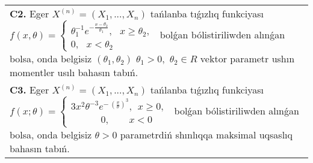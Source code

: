 \documentclass{article}
\begin{document}
\begin{tabular}{m{17cm}}
 \\
\textbf{C2.} 
Eger \(X^{(n)} = \left( X_{1},...,X_{n} \right)\) tańlanba tıǵızlıq funkciyası
$f(x,\theta) = \left\{ \begin{array}{r}
\theta_{1}^{- 1}e^{- \frac{x - \theta_{2}}{\theta_{1}}},\ \ \ x \geq \theta_{2}, \\
0,\ \ \ x < \theta_{2}
\end{array} \right.\ $
bolǵan bólistiriliwden alınǵan bolsa, onda belgisiz \(\left( \theta_{1},\theta_{2} \right)\) \(\theta_{1} > 0,\) \(\theta_{2} \in R\) vektor parametr ushın momentler usılı bahasın tabıń.
 \\
\textbf{C3.} 
Eger \(X^{(n)} = \left( X_{1},...,X_{n} \right)\) tańlanba tıǵızlıq funkciyası
$f(x;\theta) = \left\{ \begin{matrix}
3x^{2}\theta^{- 3}e^{- \ \left( \frac{x}{\theta} \right)^{3}},\ \ x \geq 0, \\
\ \ \ \ \ \ \ \ \ \ \ \ \ \ 0,\ \ \ \ \ \ \ \ \ x < 0
\end{matrix} \right.\ $
bolǵan bólistiriliwden alınǵan bolsa, onda belgisiz \(\theta > 0\) parametrdiń shınlıqqa maksimal uqsaslıq bahasın tabıń.
 \\

\end{tabular}
\vspace{1cm}
\end{document}

